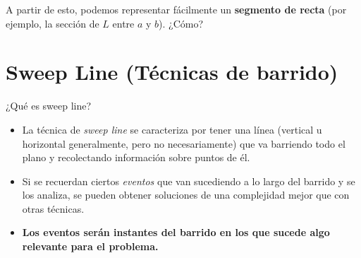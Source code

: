 \documentclass[compress]{beamer}
\newcommand{\bigpause}{\bigskip \pause}
\begin{document}
\begin{frame}

A partir de esto, podemos representar f\'acilmente un \textbf{segmento de recta} (por ejemplo, la secci\'on de $L$ entre $a$ y $b$). ¿C\'omo?

\bigpause
{}
\end{frame}






\section{Sweep Line (T\'ecnicas de barrido)}

\begin{frame}{¿Qu\'e es sweep line?}
\begin{itemize}
\item La t\'ecnica de \emph{sweep line} se caracteriza por tener una l\'inea (vertical u horizontal generalmente, pero no necesariamente) que va barriendo todo el plano y recolectando informaci\'on sobre puntos de \'el.

\bigskip 
%
\item Si se recuerdan ciertos {\it eventos} que van sucediendo a lo largo del barrido y se los analiza, se pueden obtener soluciones de una complejidad mejor que con otras t\'ecnicas.
\bigskip
\item \textbf{Los eventos ser\'an instantes del barrido en los que sucede algo relevante para el problema.}
\end{itemize}
\end{frame}
\end{document}
